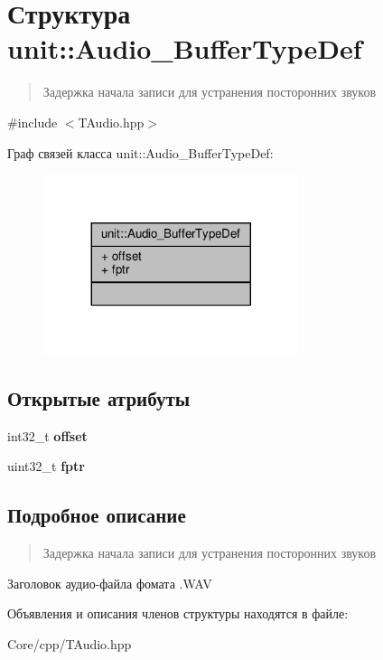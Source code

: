 \hypertarget{structunit_1_1_audio___buffer_type_def}{}\section{Структура unit\+:\+:Audio\+\_\+\+Buffer\+Type\+Def}
\label{structunit_1_1_audio___buffer_type_def}


\begin{quote}
Задержка начала записи для устранения посторонних звуков \end{quote}
 




{\ttfamily \#include $<$T\+Audio.\+hpp$>$}



Граф связей класса unit\+:\+:Audio\+\_\+\+Buffer\+Type\+Def\+:\nopagebreak
\begin{figure}[H]
\begin{center}
\leavevmode
\includegraphics[width=212pt]{structunit_1_1_audio___buffer_type_def__coll__graph}
\end{center}
\end{figure}
\subsection*{Открытые атрибуты}
\begin{DoxyCompactItemize}
\item 
\mbox{\label{structunit_1_1_audio___buffer_type_def_aec4ee0262213c87297e7aa1cc53a5f0d}} 
int32\+\_\+t {\bfseries offset}
\item 
\mbox{\label{structunit_1_1_audio___buffer_type_def_a425a22adcb26db8fc555341037bf7322}} 
uint32\+\_\+t {\bfseries fptr}
\end{DoxyCompactItemize}


\subsection{Подробное описание}
\begin{quote}
Задержка начала записи для устранения посторонних звуков \end{quote}


Заголовок аудио-\/файла фомата .W\+AV 

Объявления и описания членов структуры находятся в файле\+:\begin{DoxyCompactItemize}
\item 
Core/cpp/T\+Audio.\+hpp\end{DoxyCompactItemize}

